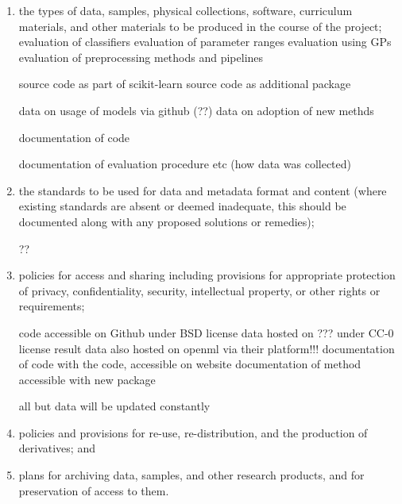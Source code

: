 \begin{enumerate}
\item the types of data, samples, physical collections, software, curriculum
    materials, and other materials to be produced in the course of the project;
evaluation of classifiers
evaluation of parameter ranges
evaluation using GPs
evaluation of preprocessing methods and pipelines

source code as part of scikit-learn
source code as additional package

data on usage of models via github (??)
data on adoption of new methds


documentation of code

documentation of evaluation procedure etc (how data was collected)

\item the standards to be used for data and metadata format and content (where
    existing standards are absent or deemed inadequate, this should be
    documented along with any proposed solutions or remedies);

??

\item policies for access and sharing including provisions for appropriate
    protection of privacy, confidentiality, security, intellectual property, or
    other rights or requirements;

code accessible on Github under BSD license
data hosted on ??? under CC-0 license
result data also hosted on openml via their platform!!!
documentation of code with the code, accessible on website
documentation of method accessible with new package


all but data will be updated constantly

\item policies and provisions for re-use, re-distribution, and the production
    of derivatives; and

\item plans for archiving data, samples, and other research products, and for
    preservation of access to them.

\end{enumerate}

%


